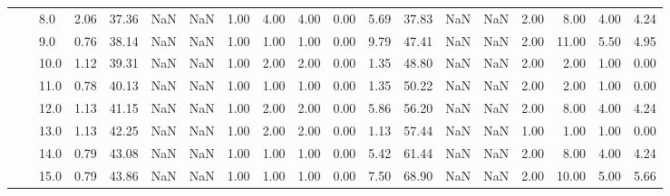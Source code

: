 \begin{tabular}{lllrrrrrrrrrrrrrrrr}
       &     & 8.0  &      2.06 &      37.36 &               NaN &                NaN &  1.00 &   4.00 &             4.00 &                         0.00 &      5.69 &      37.83 &               NaN &                NaN & 2.00 &   8.00 &             4.00 &                         4.24 \\
       &     & 9.0  &      0.76 &      38.14 &               NaN &                NaN &  1.00 &   1.00 &             1.00 &                         0.00 &      9.79 &      47.41 &               NaN &                NaN & 2.00 &  11.00 &             5.50 &                         4.95 \\
       &     & 10.0 &      1.12 &      39.31 &               NaN &                NaN &  1.00 &   2.00 &             2.00 &                         0.00 &      1.35 &      48.80 &               NaN &                NaN & 2.00 &   2.00 &             1.00 &                         0.00 \\
       &     & 11.0 &      0.78 &      40.13 &               NaN &                NaN &  1.00 &   1.00 &             1.00 &                         0.00 &      1.35 &      50.22 &               NaN &                NaN & 2.00 &   2.00 &             1.00 &                         0.00 \\
       &     & 12.0 &      1.13 &      41.15 &               NaN &                NaN &  1.00 &   2.00 &             2.00 &                         0.00 &      5.86 &      56.20 &               NaN &                NaN & 2.00 &   8.00 &             4.00 &                         4.24 \\
       &     & 13.0 &      1.13 &      42.25 &               NaN &                NaN &  1.00 &   2.00 &             2.00 &                         0.00 &      1.13 &      57.44 &               NaN &                NaN & 1.00 &   1.00 &             1.00 &                         0.00 \\
       &     & 14.0 &      0.79 &      43.08 &               NaN &                NaN &  1.00 &   1.00 &             1.00 &                         0.00 &      5.42 &      61.44 &               NaN &                NaN & 2.00 &   8.00 &             4.00 &                         4.24 \\
       &     & 15.0 &      0.79 &      43.86 &               NaN &                NaN &  1.00 &   1.00 &             1.00 &                         0.00 &      7.50 &      68.90 &               NaN &                NaN & 2.00 &  10.00 &             5.00 &                         5.66 \\

\end{tabular}
